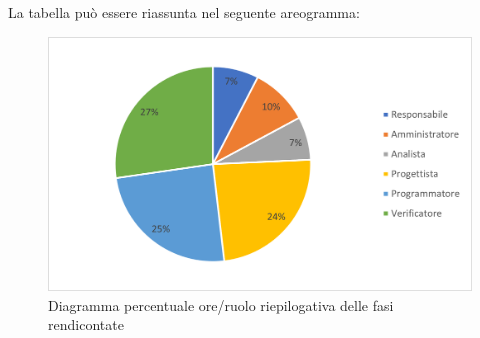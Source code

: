 			La tabella può essere riassunta nel seguente areogramma:
			\begin{figure}[H]
				\centering
				\includegraphics[width=0.8\linewidth]{res/images/preventivo/totrend2.png}
				\caption{Diagramma percentuale ore/ruolo riepilogativa delle fasi rendicontate}
				\label{fig:diagramma costi ruolo riepilogativa delle fasi rendicontate}
            \end{figure}

		